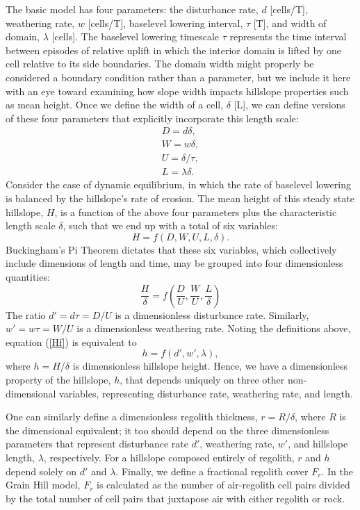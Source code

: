 \documentclass[esurf, manuscript]{copernicus}
\begin{document}
The basic model has four parameters: the disturbance rate, $d$ [cells/T], weathering rate, $w$ [cells/T], baselevel lowering interval, $\tau$ [T], and width of domain, $\lambda$ [cells]. The baselevel lowering timescale $\tau$ represents the time interval between episodes of relative uplift in which the interior domain is lifted by one cell relative to its side boundaries. The domain width might properly be considered a boundary condition rather than a parameter, but we include it here with an eye toward examining how slope width impacts hillslope properties such as mean height. Once we define the width of a cell, $\delta$ [L], we can define versions of these four parameters that explicitly incorporate this length scale:
\begin{eqnarray}
D = d\delta, \\
W = w\delta, \\
U = \delta / \tau, \\
L = \lambda \delta .
\end{eqnarray}
Consider the case of dynamic equilibrium, in which the rate of baselevel lowering is balanced by the hillslope's rate of erosion. The mean height of this steady state hillslope, $H$, is a function of the above four parameters plus the characteristic length scale $\delta$, such that we end up with a total of six variables:
\begin{equation}
H = f(D, W, U, L, \delta).
\end{equation}
Buckingham's Pi Theorem dictates that these six variables, which collectively include dimensions of length and time, may be grouped into four dimensionless quantities:
\begin{equation}
\frac{H}{\delta} = f\left( \frac{D}{U}, \frac{W}{U}, \frac{L}{\delta} \right)
\label{Hf}
\end{equation}
The ratio $d' = d\tau = D/U$ is a dimensionless disturbance rate. Similarly, $w' = w\tau = W/U$ is a dimensionless weathering rate. Noting the definitions above, equation (\ref{Hf}) is equivalent to
\begin{equation}
h = f\left( d', w', \lambda \right),
\end{equation}
where $h = H/\delta$ is dimensionless hillslope height. Hence, we have a dimensionless property of the hillslope, $h$, that depends uniquely on three other non-dimensional variables, representing disturbance rate, weathering rate, and length.

One can similarly define a dimensionless regolith thickness, $r = R/\delta$, where $R$ is the dimensional equivalent; it too should depend on the three dimensionless parameters that represent disturbance rate $d'$, weathering rate, $w'$, and hillslope length, $\lambda$, respectively. For a hillslope composed entirely of regolith, $r$ and $h$ depend solely on $d'$ and $\lambda$. Finally, we define a fractional regolith cover $F_r$. In the Grain Hill model, $F_r$ is calculated as the number of air-regolith cell pairs divided by the total number of cell pairs that juxtapose air with either regolith or rock.
\end{document}
